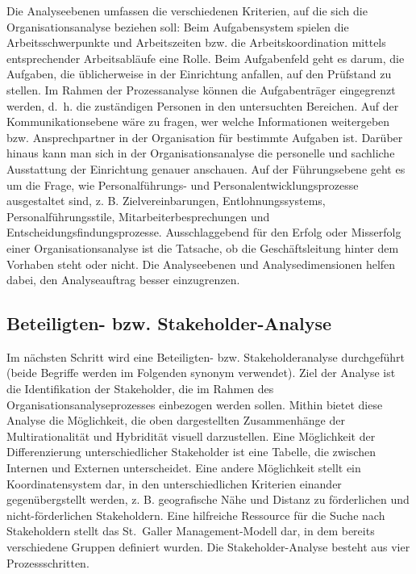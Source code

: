 \documentclass[
  letterpaper,
]{book}
\begin{document}
Die Analyseebenen umfassen die verschiedenen Kriterien, auf die sich die
Organisationsanalyse beziehen soll: Beim Aufgabensystem spielen die
Arbeitsschwerpunkte und Arbeitszeiten bzw. die Arbeitskoordination
mittels entsprechender Arbeitsabläufe eine Rolle. Beim Aufgabenfeld geht
es darum, die Aufgaben, die üblicherweise in der Einrichtung anfallen,
auf den Prüfstand zu stellen. Im Rahmen der Prozessanalyse können die
Aufgabenträger eingegrenzt werden, d.~h. die zuständigen Personen in den
untersuchten Bereichen. Auf der Kommunikationsebene wäre zu fragen, wer
welche Informationen weitergeben bzw. Ansprechpartner in der
Organisation für bestimmte Aufgaben ist. Darüber hinaus kann man sich in
der Organisationsanalyse die personelle und sachliche Ausstattung der
Einrichtung genauer anschauen. Auf der Führungsebene geht es um die
Frage, wie Personalführungs- und Personalentwicklungsprozesse
ausgestaltet sind, z. B. Zielvereinbarungen, Entlohnungssystems,
Personalführungsstile, Mitarbeiterbesprechungen und
Entscheidungsfindungsprozesse. Ausschlaggebend für den Erfolg oder
Misserfolg einer Organisationsanalyse ist die Tatsache, ob die
Geschäftsleitung hinter dem Vorhaben steht oder nicht. Die Analyseebenen
und Analysedimensionen helfen dabei, den Analyseauftrag besser
einzugrenzen.

\subsection{Beteiligten- bzw.
Stakeholder-Analyse}\label{beteiligten--bzw.-stakeholder-analyse}

Im nächsten Schritt wird eine Beteiligten- bzw. Stakeholderanalyse
durchgeführt (beide Begriffe werden im Folgenden synonym verwendet).
Ziel der Analyse ist die Identifikation der Stakeholder, die im Rahmen
des Organisationsanalyseprozesses einbezogen werden sollen. Mithin
bietet diese Analyse die Möglichkeit, die oben dargestellten
Zusammenhänge der Multirationalität und Hybridität visuell darzustellen.
Eine Möglichkeit der Differenzierung unterschiedlicher Stakeholder ist
eine Tabelle, die zwischen Internen und Externen unterscheidet. Eine
andere Möglichkeit stellt ein Koordinatensystem dar, in den
unterschiedlichen Kriterien einander gegenübergstellt werden, z. B.
geografische Nähe und Distanz zu förderlichen und nicht-förderlichen
Stakeholdern. Eine hilfreiche Ressource für die Suche nach Stakeholdern
stellt das St.~Galler Management-Modell dar, in dem bereits verschiedene
Gruppen definiert wurden. Die Stakeholder-Analyse besteht aus vier
Prozessschritten.
\end{document}
